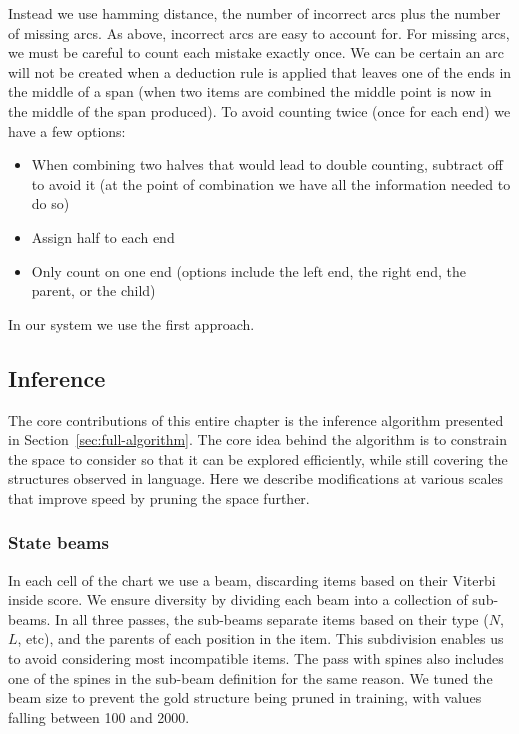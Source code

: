 Instead we use hamming distance, the number of incorrect arcs plus the number of missing arcs.
As above, incorrect arcs are easy to account for.
For missing arcs, we must be careful to count each mistake exactly once.
We can be certain an arc will not be created when a deduction rule is applied that leaves one of the ends in the middle of a span (\myeg when two items are combined the middle point is now in the middle of the span produced).
To avoid counting twice (once for each end) we have a few options:

\begin{itemize}
  \item When combining two halves that would lead to double counting, subtract off to avoid it (at the point of combination we have all the information needed to do so)
  \item Assign half to each end
  \item Only count on one end (options include the left end, the right end, the parent, or the child)
\end{itemize}

\noindent
In our system we use the first approach.

\subsection{Inference} \label{sec:inference}

The core contributions of this entire chapter is the inference algorithm presented in Section~\ref{sec:full-algorithm}.
The core idea behind the algorithm is to constrain the space to consider so that it can be explored efficiently, while still covering the structures observed in language.
Here we describe modifications at various scales that improve speed by pruning the space further.

\subsubsection{State beams}

In each cell of the chart we use a beam, discarding items based on their Viterbi inside score.
We ensure diversity by dividing each beam into a collection of sub-beams.
In all three passes, the sub-beams separate items based on their type ($N$, $L$, etc), and the parents of each position in the item.
This subdivision enables us to avoid considering most incompatible items.
The pass with spines also includes one of the spines in the sub-beam definition for the same reason.
We tuned the beam size to prevent the gold structure being pruned in training, with values falling between 100 and 2000.

